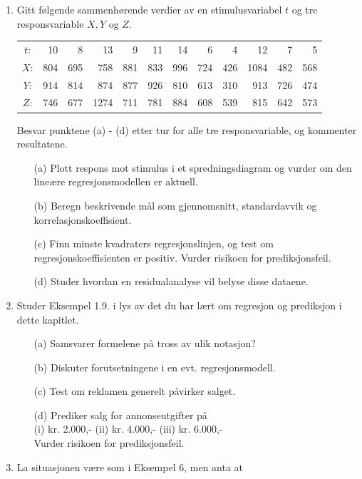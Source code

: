 \begin{enumerate}
\item     Gitt følgende sammenhørende verdier av en
          stimulusvariabel $t$ og tre responsvariable $X,Y$ og $Z$.
     \begin{center} \addtolength{\tabcolsep}{-0.2\tabcolsep}
     \begin{tabular}{crrrrrrrrrrr}
       $t$: & 10  &  8 &  13 & 9 & 11 & 14 & 6 & 4 & 12 & 7 &  5 \\
       $X$: &804 & 695 & 758 & 881&833& 996&724&426&1084&482&568 \\
       $Y$: &914 & 814 & 874 & 877&926& 810&613&310& 913&726&474 \\
       $Z$: &746 & 677 &1274 & 711&781& 884&608&539& 815&642&573
\end{tabular}
\end{center}
          Besvar punktene (a) - (d) etter tur for alle tre
          responsvariable, og kommenter resultatene.
 \begin{itemize}
  \item[(a)]  Plott respons mot stimulus i et spredningsdiagram
               og vurder om den lineære regresjonsmodellen er
               aktuell.
  \item[(b)]  Beregn beskrivende mål som gjennomsnitt,
               standardavvik og korrelasjonskoeffisient.
  \item[(c)]  Finn minste kvadraters regresjonslinjen, og test
               om regresjonskoeffisienten er positiv. Vurder
               risikoen for prediksjonsfeil.
  \item[(d)]   Studer hvordan en residualanalyse vil belyse disse
               dataene.
 \end{itemize}
\item     Studer Eksempel 1.9. i lys av det du har lært om
          regresjon og prediksjon i dette kapitlet.
 \begin{itemize}
  \item[(a)]  Samsvarer formelene på tross av ulik notasjon?
  \item[(b)]  Diskuter forutsetningene i en evt. regresjonsmodell.
  \item[(c)]  Test om reklamen generelt påvirker salget. 
  \item[(d)]  Prediker salg for annonseutgifter på\\
                  (i) kr. 2.000,- (ii) kr. 4.000,-  (iii) kr. 6.000,-\\
          Vurder risikoen for prediksjonsfeil.
 \end{itemize}
\item     La situasjonen være som i Eksempel 6, men anta at

\end{enumerate}
